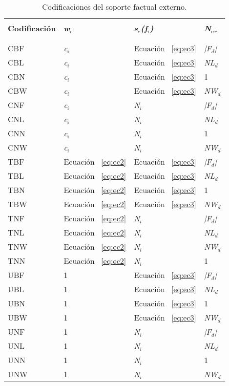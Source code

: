 \begin{table}
  \centering
  \renewcommand{\arraystretch}{1.3}
   \begin{tabular}{ l l l l }
    \hline
     & & \\
   \textbf{Codificaci\'on} & \textbf{\emph{w${_i}$}} & \textbf{\emph{s${_e}$(f${_i}$)}} & \textbf{\emph{N${_o}$${_r}$}} \\ \\
   \hline
    & & \\
   CBF & \emph{c${_i}$} & Ecuaci\'on ~\ref{eq:ec3} & \emph{|F${_d}$|} \\
   CBL & \emph{c${_i}$} & Ecuaci\'on ~\ref{eq:ec3} & \emph{NL${_d}$} \\
   CBN & \emph{c${_i}$} & Ecuaci\'on ~\ref{eq:ec3} & 1 \\
   CBW & \emph{c${_i}$} & Ecuaci\'on ~\ref{eq:ec3} & \emph{NW${_d}$} \\
   CNF & \emph{c${_i}$} & \emph{N${_i}$} & \emph{|F${_d}$|} \\
   CNL & \emph{c${_i}$} & \emph{N${_i}$} & \emph{NL${_d}$} \\
   CNN & \emph{c${_i}$} & \emph{N${_i}$} & 1 \\
   CNW & \emph{c${_i}$} & \emph{N${_i}$} & \emph{NW${_d}$} \\
   TBF & Ecuaci\'on ~\ref{eq:ec2} & Ecuaci\'on ~\ref{eq:ec3} & \emph{|F${_d}$|} \\
   TBL & Ecuaci\'on ~\ref{eq:ec2} & Ecuaci\'on ~\ref{eq:ec3} & \emph{NL${_d}$} \\
   TBN & Ecuaci\'on ~\ref{eq:ec2} & Ecuaci\'on ~\ref{eq:ec3} & 1 \\
   TBW & Ecuaci\'on ~\ref{eq:ec2} & Ecuaci\'on ~\ref{eq:ec3} & \emph{NW${_d}$} \\
   TNF & Ecuaci\'on ~\ref{eq:ec2} & \emph{N${_i}$} & \emph{|F${_d}$|} \\
   TNL & Ecuaci\'on ~\ref{eq:ec2} & \emph{N${_i}$} & \emph{NL${_d}$} \\
   TNW & Ecuaci\'on ~\ref{eq:ec2} & \emph{N${_i}$} & \emph{NW${_d}$} \\
   TNN & Ecuaci\'on ~\ref{eq:ec2} & \emph{N${_i}$} & 1 \\
   UBF & 1 & Ecuaci\'on ~\ref{eq:ec3} & \emph{|F${_d}$|} \\
   UBL & 1 & Ecuaci\'on ~\ref{eq:ec3} & \emph{NL${_d}$} \\
   UBN & 1 & Ecuaci\'on ~\ref{eq:ec3} & 1 \\
   UBW & 1 & Ecuaci\'on ~\ref{eq:ec3} & \emph{NW${_d}$} \\
   UNF & 1 & \emph{N${_i}$} & \emph{|F${_d}$|} \\
   UNL & 1& \emph{N${_i}$} & \emph{NL${_d}$} \\
   UNN & 1 & \emph{N${_i}$} & 1 \\
   UNW & 1 & \emph{N${_i}$} & \emph{NW${_d}$} \\
   \hline
   \end{tabular}
\caption {Codificaciones del soporte factual externo.}
\label{table:tablacod1}
\end{table}


